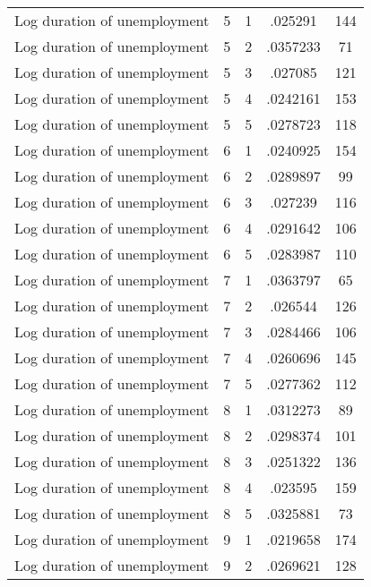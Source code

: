 \begin{tabular}{l*{4}{c}}
Log duration of unemployment&           5&           1&     .025291&         144\\
Log duration of unemployment&           5&           2&    .0357233&          71\\
Log duration of unemployment&           5&           3&     .027085&         121\\
Log duration of unemployment&           5&           4&    .0242161&         153\\
Log duration of unemployment&           5&           5&    .0278723&         118\\
Log duration of unemployment&           6&           1&    .0240925&         154\\
Log duration of unemployment&           6&           2&    .0289897&          99\\
Log duration of unemployment&           6&           3&     .027239&         116\\
Log duration of unemployment&           6&           4&    .0291642&         106\\
Log duration of unemployment&           6&           5&    .0283987&         110\\
Log duration of unemployment&           7&           1&    .0363797&          65\\
Log duration of unemployment&           7&           2&     .026544&         126\\
Log duration of unemployment&           7&           3&    .0284466&         106\\
Log duration of unemployment&           7&           4&    .0260696&         145\\
Log duration of unemployment&           7&           5&    .0277362&         112\\
Log duration of unemployment&           8&           1&    .0312273&          89\\
Log duration of unemployment&           8&           2&    .0298374&         101\\
Log duration of unemployment&           8&           3&    .0251322&         136\\
Log duration of unemployment&           8&           4&     .023595&         159\\
Log duration of unemployment&           8&           5&    .0325881&          73\\
Log duration of unemployment&           9&           1&    .0219658&         174\\
Log duration of unemployment&           9&           2&    .0269621&         128\\

\end{tabular}
